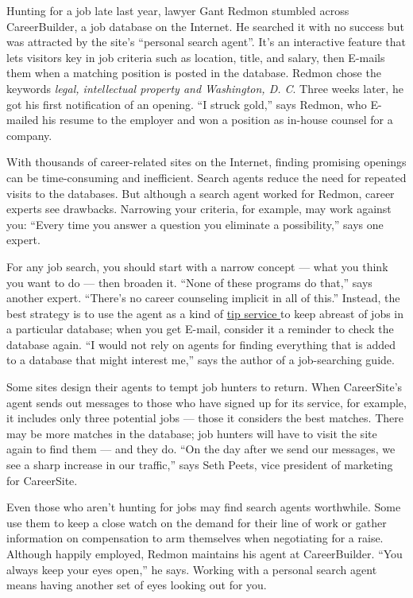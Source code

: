 \documentclass[UTF8,11pt]{ctexart}
\begin{document}
Hunting for a job late last year, lawyer Gant Redmon stumbled across CareerBuilder, a job database on the Internet. He searched it with no success but was attracted by the site’s “personal search agent”. It’s an interactive feature that lets visitors key in job criteria such as location, title, and salary, then E-mails them when a matching position is posted in the database. Redmon chose the keywords \textit{legal, intellectual property and Washington, D. C}. Three weeks later, he got his first notification of an opening. “I struck gold,” says Redmon, who E-mailed his resume to the employer and won a position as in-house counsel for a company.


With thousands of career-related sites on the Internet, finding promising openings can be time-consuming and inefficient. Search agents reduce the need for repeated visits to the databases. But although a search agent worked for Redmon, career experts see drawbacks. Narrowing your criteria, for example, may work against you: “Every time you answer a question you eliminate a possibility,” says one expert.


For any job search, you should start with a narrow concept — what you think you want to do — then broaden it. “None of these programs do that,” says another expert. “There’s no career counseling implicit in all of this.” Instead, the best strategy is to use the agent as a kind of \uline{tip service }to keep abreast of jobs in a particular database; when you get E-mail, consider it a reminder to check the database again. “I would not rely on agents for finding everything that is added to a database that might interest me,” says the author of a job-searching guide.


Some sites design their agents to tempt job hunters to return. When CareerSite’s agent sends out messages to those who have signed up for its service, for example, it includes only three potential jobs — those it considers the best matches. There may be more matches in the database; job hunters will have to visit the site again to find them — and they do. “On the day after we send our messages, we see a sharp increase in our traffic,” says Seth Peets, vice president of marketing for CareerSite.


Even those who aren’t hunting for jobs may find search agents worthwhile. Some use them to keep a close watch on the demand for their line of work or gather information on compensation to arm themselves when negotiating for a raise. Although happily employed, Redmon maintains his agent at CareerBuilder. “You always keep your eyes open,” he says. Working with a personal search agent means having another set of eyes looking out for you.
\end{document}
